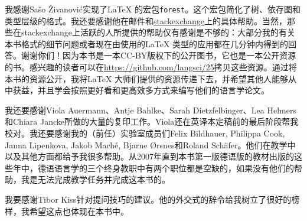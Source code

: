 我感谢Sašo Živanović实现了\LaTeX{} 的宏包\texttt{forest}。这个宏包简化了树、依存图和类型层级的格式。我还要感谢他在邮件和\href{http://www.stackexchange.com}{stackexchange}上的具体帮助。当然，那些在stackexchange上活跃的人所提供的帮助仅有感谢是不够的：大部分我的有关本书格式的细节问题或者现在由\lsp 使用的\LaTeX{} 类型的应用都在几分钟内得到的回答。谢谢你们！因为本书是一本CC-BY版权下的公开图书，它也是一本公开资源的书。感兴趣的读者可以在\url{https://github.com/langsci/25}拷贝这些资源。通过将本书的资源公开，我将\LaTeX{} 大师们提供的资源传递下去，并希望其他人能够从中获益，并且学会按照更好看和更高效多方式来编写他们的语言学论文。

我还要感谢Viola Auermann、Antje Bahlke、Sarah Dietzfelbinger、Lea Helmers和Chiara Jancke所做的大量的复印工作。Viola还在英译本定稿前的最后阶段帮我校对。我还要感谢我的（前任）实验室成员们Felix Bildhauer, Philippa Cook, Janna Lipenkova, Jakob Maché, Bjarne Ørsnes和Roland Schäfer。他们在教学中以及其他方面都给予我很多帮助。从2007年直到本书第一版德语版的教材出版的这些年中，德语语言学的三个终身教职中有两个职位都是空缺的，如果没有他们的帮助，我是无法完成教学任务并完成这本书的。

我要感谢Tibor Kiss针对提问技巧的建议。他的外交式的辞令给我树立了很好的榜样，我希望这点也体现在本书中。

